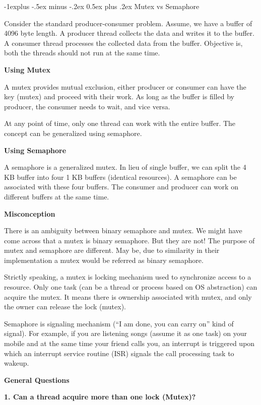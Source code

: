 \documentclass[8pt,landscape]{article}
\makeatletter
\renewcommand{\subsection}{\@startsection{subsection}{2}{0mm}%
                                {-1explus -.5ex minus -.2ex}%
                                {0.5ex plus .2ex}%
                                {\normalfont\scriptsize\bfseries}}
\makeatother
\begin{document}
\begin{multicols}{3}
\begin{tiny}
\subsection{Mutex vs Semaphore}

Consider the standard producer-consumer problem. Assume, we have a buffer of 4096 byte length. A producer thread collects the data and writes it to the buffer. A consumer thread processes the collected data from the buffer. Objective is, both the threads should not run at the same time.

\textbf{Using Mutex}

A mutex provides mutual exclusion, either producer or consumer can have the key (mutex) and proceed with their work. As long as the buffer is filled by producer, the consumer needs to wait, and vice versa.

At any point of time, only one thread can work with the entire buffer. The concept can be generalized using semaphore.

\textbf{Using Semaphore}

A semaphore is a generalized mutex. In lieu of single buffer, we can split the 4 KB buffer into four 1 KB buffers (identical resources). A semaphore can be associated with these four buffers. The consumer and producer can work on different buffers at the same time.

\textbf{Misconception}

There is an ambiguity between binary semaphore and mutex. We might have come across that a mutex is binary semaphore. But they are not! The purpose of mutex and semaphore are different. May be, due to similarity in their implementation a mutex would be referred as binary semaphore.

Strictly speaking, a mutex is locking mechanism used to synchronize access to a resource. Only one task (can be a thread or process based on OS abstraction) can acquire the mutex. It means there is ownership associated with mutex, and only the owner can release the lock (mutex).

Semaphore is signaling mechanism (“I am done, you can carry on” kind of signal). For example, if you are listening songs (assume it as one task) on your mobile and at the same time your friend calls you, an interrupt is triggered upon which an interrupt service routine (ISR) signals the call processing task to wakeup.

\textbf{General Questions}

\textbf{1. Can a thread acquire more than one lock (Mutex)?}


\end{tiny}
\end{multicols}
\end{document}
